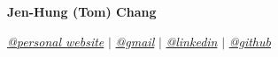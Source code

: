 \documentclass[letterpaper,11pt]{article}
\makeatletter
\newcommand{\namespace}{
\vspace{3pt}
}
\newcommand{\sectionspace}{
\vspace{-20pt}
}
\newcommand{\subheadingtitlevspace}{
\vspace{-3pt}
}
\newcommand{\resumeSubheading}[4]{
   \item
     \begin{tabular*}{0.97\textwidth}[t]{l@{\extracolsep{\fill}}r}
       \textbf{#1} | \emph{#2} & \textit{#4}\\
       \textit{#3} \\
     \end{tabular*}\vspace{-8pt}
 }
\newcommand{\resumeSubHeadingListStart}{\subheadingtitlevspace\begin{itemize}[leftmargin=0.15in, label={}]}
\newcommand{\resumeSubHeadingListEnd}{\end{itemize}}
\makeatother
\begin{document}
\begin{center}
    \textbf{\huge{\center Jen-Hung (Tom) Chang }} \\
    \namespace
    \href{https://personal-website}{{\textit{@personal website}}} $|$
    \href{mailto:tom.jenhungchang@gmail.com}{{\textit{@gmail}}} $|$ 
    \href{https://linkedin.com/in/JenhungChang}{{\textit{@linkedin}}} $|$
    \href{https://github.com/tom89622}{{\textit{@github}}}
    \vspace{-8pt}
\end{center}



\end{document}
